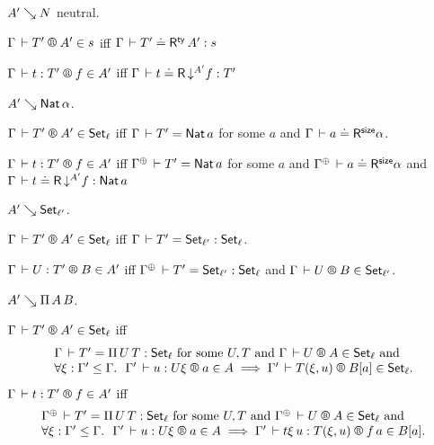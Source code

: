 \documentclass[acmlarge,review,anonymous]{acmart}\settopmatter{printfolios=true}
\begin{document}
\begin{caselist}

\vspace{2ex}
\nextcase $A' \evalsto N$ neutral.

  \noindent
  $\LRTS{\Gamma}{T'}{A'} s$ iff
  $\Gamma \der T' \doteq \tRty\,A' : s$

  \noindent
  $\LR{\Gamma}{t}{T'}{f}{A'}$ iff
  $\Gamma \der t \doteq \tR \, \down {A'} f : T'$

\vspace{2ex}
\nextcase $A' \evalsto \Nat \alpha$.

  \noindent
  $\LRT{\Gamma}{T'}{A'}\ell$ iff $\Gamma \der T' = \Nat a$ for some $a$ and $\LRSize \Gamma a \alpha$.

  \noindent
  $\LR{\Gamma}{t}{T'}{f}{A'}$ iff $\resurrect\Gamma \der T' = \Nat a$ for some $a$ and
  $\LRSize {\resurrect\Gamma} a \alpha$ and
  $\Gamma \der t \doteq \tR\,\down{A'} f : \Nat a$


\vspace{2ex}
\nextcase $A' \evalsto \Set[\ell']$.

  \noindent
  $\LRT {\Gamma} {T'} {A'} \ell$ iff $\Gamma \der T' = \Set[\ell'] : \Set[\ell]$.

  \noindent
  $\LR \Gamma U {T'} B {A'}$ iff
  $\resurrect\Gamma \der T' = \Set[\ell'] : \Set[\ell]$ and $\LRT \Gamma U B {\ell'}$.

\vspace{2ex}
\nextcase $A' \evalsto \piT A B$.

\noindent
$\LRT \Gamma {T'} {A'} \ell$ iff
\[
\begin{array}{l}
\Gamma \der T' = \piT U T : \Set[\ell] \mforsome U, T \mand \LRT \Gamma U A \ell \mand \\
\forall \xi : \Gamma' \leq \Gamma.\ \
\LR {\Gamma'} u {U\xi} a A \implies \LRT {\Gamma'} {T(\xi,u)} {B[a]} \ell
. \\
\end{array}
\]
$\LR \Gamma t {T'} f {A'}$ iff
\[
\begin{array}{l}
\resurrect\Gamma \der T' = \piT U T : \Set[\ell] \mforsome U, T \mand \LRT {\resurrect\Gamma} U A \ell \mand \\
\forall \xi : \Gamma' \leq \Gamma.\ \
\LR {\Gamma'} u {U\xi} a A \implies \LR {\Gamma'} {t\xi\,u} {T(\xi,u)} {f\,a} {B[a]}
.
\end{array}
\]


\end{caselist}
\end{document}
